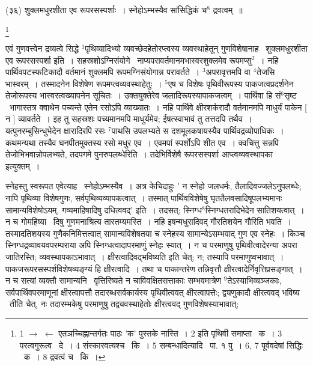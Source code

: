 \documentclass[11pt, openany]{book}
\newcommand\blfootnote[1]{%
 \begingroup
 \renewcommand\thefootnote{}\footnote{#1}%
 \addtocounter{footnote}{-1}%
 \endgroup
}
\begin{document}
\hangindent=2cm {\knu (३६) शुक्लमधुरशीता एव रूपरसस्पर्शाः~। स्नेहोऽम्भस्यैव सांसिद्धिकं च$^8$ द्रवत्वम्~॥}

\blfootnote{1 $\rightarrow$ $\leftarrow$ एतञच्चिह्नान्तर्गतः पाठः 'क' पुस्तके नास्ति~। 2 इति पृथिवी समाप्ता  \textendash\ क~। 3 परत्वगुरूत्व  \textendash\ दे~। 4 संस्कारवत्यश्च  \textendash\ कि~। 5 सम्बन्धादित्यादि  \textendash\ पा. १ पु~। 6, 7 पूर्ववदेषां सिद्धिः  \textendash\ क~। 8 द्रवत्वं च  \textendash\ कि~।}

\newpage
एवं गुणवत्त्वेन द्रव्यत्वे सिद्धे ${}^1$पृथिव्यादिभ्यो व्यवच्छेदहेतोरप्त्वस्य व्यवस्थाहेतून् गुणविशेषानाह \textendash\ {\knu शुक्लमधुरशीता एव रूपरसस्पर्शा} इति~। सहस्रशोऽग्निसंयोगे \textendash\ नाप्यपरावर्तमानमभास्वरशुक्लमेव रूपमप्सु$^2$~। नहि पार्थिवपटस्फटिकादौ वर्तमानं शुक्लमपि रूपमग्निसंयोगान्न परावर्तते~। ${}^3$अपरावृत्तमपि वा ${}^4$तेजसि भास्वरम्~। तस्मादनेन विशेषेण रूपमप्त्वव्यवस्थाहेतुः~। ${}^5$एष च विशेषः पृथिवीरूपस्य पाकजत्वप्रदर्शनेन तेजोरूपस्य भास्वरत्वख्यापनेन सूचितः~। उक्तयुक्तेरेव जलादिरूपस्यापाकजत्वम्~। पार्थिवा हि सं$^6$सृष्ट \textendash\ भागास्तत्र क्वाथेन पच्यन्ते एतेन रसोऽपि व्याख्यातः~। नहि पार्थिवे क्षीरशर्करादौ वर्तमानमपि माधुर्यं पाकेन [ न ] व्यावर्तते~। इह तु सहस्रशः पच्यमानमपि माधुर्यमेव; ईषत्स्वाभावं तु तत्तदपि तथैव~। यत्पुनरम्बुसिन्धुभेदेन क्षारादिरपि रसः ${}^7$पाथसि उपलभ्यते स दशमूलकषायस्यैव पार्थिवद्रव्योपाधिकः~। कथमन्यथा तस्यैव घनपीतमुक्तस्य रसो मधुर एव~। एवमपां स्पर्शोऽपि शीत एव~। क्वचित्तु सन्नपि तेजोभिभवान्नोपलभ्यते, तदपगमे पुनरुपलब्धेरिति~। तदेभिर्विशेषै रूपरसस्पर्शा आप्त्वव्यवस्थापका इत्युक्तम्~।

स्नेहस्तु स्वरूपत एवेत्याह \textendash\ स्नेहोऽम्भस्यैव~। अत्र केचिदाहुः ' न स्नेहो जलधर्मः, तैलादिवज्जलेऽनुपलब्धेः; नापि पृथिव्या विशेषगुणः, सर्वपृथिव्यव्यापकत्वात्~। तस्मात् पार्थिवविशेषेषु घृततैलवसादिषूपलभ्यमानः सामान्यविशेषोऽयम्, गव्यमाहिषादिषु दधित्ववद्' इति~। तदसत्; स्निग्ध$^8$स्निग्धतरादिभेदेन सातिशयत्वात्~। न च गोमहिष्या \textendash\ दिषु गुणमनाश्रित्य तारतम्यमस्ति~। नहि इषन्मधुरादिवद् गौरतिशयेन गौरिति भवति~। तस्मादतिशयस्य गुणैकनिमित्तत्वात् सामान्यविशेषतया च स्नेहस्य सामान्येऽसम्भवाद् गुण एव स्नेहः~। किञ्च स्निग्धद्रव्यावयवपरम्पराया अपि स्निग्धत्वादापरमाणुं स्नेहः स्यात्~। न च परमाणुषु पृथिवीत्वादेरन्या अपरा जातिरस्ति; व्यवस्थापकाऽभावात्~। क्षीरत्वादिवद्भविष्यति इति चेत्; न; तस्यापि परमाणुष्वभावात्~। पाकजरूपरसस्पर्शविशेषव्यङ्ग्यं हि क्षीरत्वादि~। तथा च पाकान्तरेण तन्निवृत्तौ क्षीरत्वादेर्निवृत्तिप्रसङ्गात्~। न च सत्यां व्यक्तौ सामान्यनि \textendash\ वृत्तिरिष्यते न चाविवक्षितसत्ताकाः सम्भवमात्रेण ${}^9$तेऽस्याभिव्यञ्जकाः, सर्वपार्थिवपरमाणूनां क्षीरत्वापत्तौ तदारब्धसर्वकार्यस्य पृथिवीत्ववत् क्षीरत्वापत्तेः; द्व्यणुकादौ क्षीरत्ववद् भविष्य \textendash\ तीति चेत्, नः तदारम्भकेषु परमाणुषु तद्व्यवस्थाहेतोः क्षीरत्ववद् गुणविशेषस्याभावात्;
\end{document}
